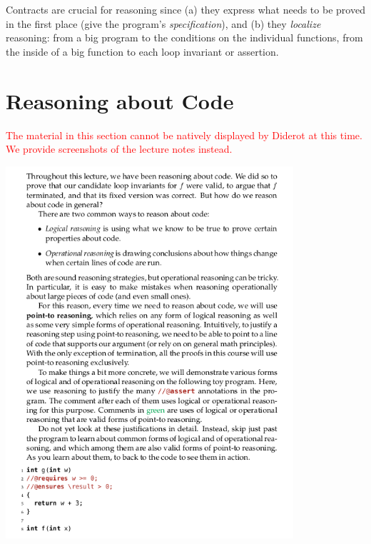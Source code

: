 Contracts are crucial for reasoning since (a) they express what needs
to be proved in the first place (give the program's
\emph{specification}), and (b) they \emph{localize} reasoning: from a
big program to the conditions on the individual functions, from the
inside of a big function to each loop invariant or assertion.


\clearpage
\section{Reasoning about Code}

\textcolor{red}{The material in this section cannot be natively
  displayed by Diderot at this time.  We provide screenshots of the
  lecture notes instead.}

\begin{center}
  \includegraphics[width=0.8\textwidth]{img/reasoning1.png}
\end{center}
